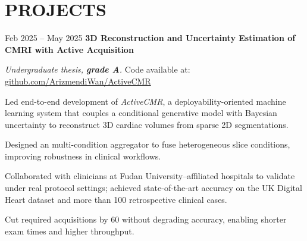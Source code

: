 \section{PROJECTS}

\vspace{0.20 cm}
\begin{twocolentry}{
        Feb 2025 – May 2025
    }
    {\ResumeEntryTitleFont\textbf{3D Reconstruction and Uncertainty Estimation of CMRI with Active Acquisition}}
\end{twocolentry}

\vspace{0.10 cm}
\begin{onecolentry}
    \textit{Undergraduate thesis, \textbf{grade A}.} Code available at: \href{https://github.com/ArizmendiWan/ActiveCMR}{github.com/ArizmendiWan/ActiveCMR}
\end{onecolentry}

\vspace{0.10 cm}
\begin{onecolentry}
    \begin{highlights}
        \item {\ResumeBulletFont Led end-to-end development of \textit{ActiveCMR}, a deployability-oriented machine learning system that couples a conditional generative model with Bayesian uncertainty to reconstruct 3D cardiac volumes from sparse 2D segmentations.}
        \item {\ResumeBulletFont Designed an multi-condition aggregator to fuse heterogeneous slice conditions, improving robustness in clinical workflows.}
        \item {\ResumeBulletFont Collaborated with clinicians at Fudan University–affiliated hospitals to validate under real protocol settings; achieved state-of-the-art accuracy on the UK Digital Heart dataset and more than 100 retrospective clinical cases.}
        \item {\ResumeBulletFont Cut required acquisitions by 60 without degrading accuracy, enabling shorter exam times and higher throughput.}
    \end{highlights}
\end{onecolentry}
